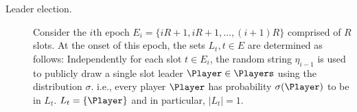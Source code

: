 \begin{minipage}[c]{\textwidth}
\begin{framed}
\begin{description}
			\item[Leader election.]
			Consider the $i$th epoch $E_i = \{iR + 1, iR + 1, \ldots, (i+1)R\}$ comprised of $R$ slots.
			At the onset of this epoch, the sets $L_t, t \in E$ are determined as follows:
			Independently for each slot $t \in E_i$, the random string $\eta_{i-1}$ is used to publicly draw 
			a single slot leader $\Player \in \Players$ using the distribution $\sigma$. 			
			i.e., every player $\Player$ has probability $\sigma(\Player)$ 
			to be in $L_t$. 
			$L_t = \{\Player\}$ and in particular, $|L_t| = 1$.

		\end{description}

	\end{framed}
\end{minipage}



